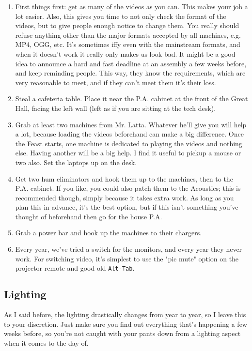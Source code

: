 \documentclass[letterpaper,10pt,oneside,headsepline]{scrreprt}
\begin{document}
\begin{enumerate}
\item First things first: get as many of the videos as you can. This makes your job a lot easier. Also, this gives you time to not only check the format of the videos, but to give people enough notice to change them. You really should refuse anything other than the major formats accepted by all machines, e.g. MP4, OGG, etc. It's sometimes iffy even with the mainstream formats, and when it doesn't work it really only makes us look bad. It might be a good idea to announce a hard and fast deadline at an assembly a few weeks before, and keep reminding people. This way, they know the requirements, which are very reasonable to meet, and if they can't meet them it's their loss.
\item Steal a cafeteria table. Place it near the P.A. cabinet at the front of the Great Hall, facing the left wall (left as if you are sitting at the tech desk).
\item Grab at least two machines from Mr. Latta. Whatever he'll give you will help a lot, because loading the videos beforehand can make a big difference. Once the Feast starts, one machine is dedicated to playing the videos and nothing else. Having another will be a big help. I find it useful to pickup a mouse or two also. Set the laptops up on the desk.
\item Get two hum eliminators and hook them up to the machines, then to the P.A. cabinet. If you like, you could also patch them to the Acoustics; this is recommended though, simply because it takes extra work. As long as you plan this in advance, it's the best option, but if this isn't something you've thought of beforehand then go for the house P.A.

\item Grab a power bar and hook up the machines to their chargers.
\item Every year, we've tried a switch for the monitors, and every year they never work. For switching video, it's simplest to use the "pic mute" option on the projector remote and good old \texttt{Alt-Tab}.
\end{enumerate} 

\subsection{Lighting}
As I said before, the lighting drastically changes from year to year, so I leave this to your discretion. Just make sure you find out everything that's happening a few weeks before, so you're not caught with your pants down from a lighting aspect when it comes to the day-of.
\end{document}
